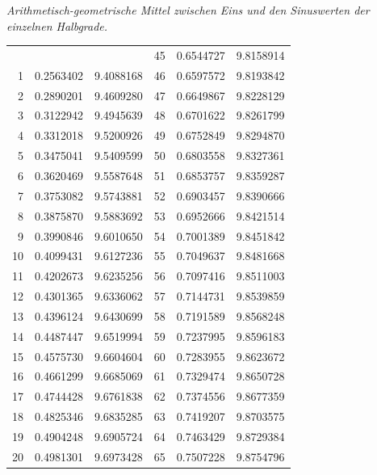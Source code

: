 \begingroup
\renewcommand{\arraystretch}{1.45}
\clearpage
{}
\begin{center}
\textit{Arithmetisch-geometrische Mittel zwischen Eins und den Sinuswerten der einzelnen Halbgrade.}\par
\medskip
\begingroup\fontsize{9}{10.2}\selectfont\setlength{\tabcolsep}{4pt}\renewcommand{\arraystretch}{1.0}
\begin{tabular}{||r|r|r||r|r|r||}\hline\hline
 &  &  & 45 & 0.6544727 & 9.8158914 \\
1 & 0.2563402 & 9.4088168 & 46 & 0.6597572 & 9.8193842 \\
2 & 0.2890201 & 9.4609280 & 47 & 0.6649867 & 9.8228129 \\
3 & 0.3122942 & 9.4945639 & 48 & 0.6701622 & 9.8261799 \\
4 & 0.3312018 & 9.5200926 & 49 & 0.6752849 & 9.8294870 \\
5 & 0.3475041 & 9.5409599 & 50 & 0.6803558 & 9.8327361 \\[3pt]
6 & 0.3620469 & 9.5587648 & 51 & 0.6853757 & 9.8359287 \\
7 & 0.3753082 & 9.5743881 & 52 & 0.6903457 & 9.8390666 \\
8 & 0.3875870 & 9.5883692 & 53 & 0.6952666 & 9.8421514 \\
9 & 0.3990846 & 9.6010650 & 54 & 0.7001389 & 9.8451842 \\
10 & 0.4099431 & 9.6127236 & 55 & 0.7049637 & 9.8481668 \\[3pt]
11 & 0.4202673 & 9.6235256 & 56 & 0.7097416 & 9.8511003 \\
12 & 0.4301365 & 9.6336062 & 57 & 0.7144731 & 9.8539859 \\
13 & 0.4396124 & 9.6430699 & 58 & 0.7191589 & 9.8568248 \\
14 & 0.4487447 & 9.6519994 & 59 & 0.7237995 & 9.8596183 \\
15 & 0.4575730 & 9.6604604 & 60 & 0.7283955 & 9.8623672 \\[3pt]
16 & 0.4661299 & 9.6685069 & 61 & 0.7329474 & 9.8650728 \\
17 & 0.4744428 & 9.6761838 & 62 & 0.7374556 & 9.8677359 \\
18 & 0.4825346 & 9.6835285 & 63 & 0.7419207 & 9.8703575 \\
19 & 0.4904248 & 9.6905724 & 64 & 0.7463429 & 9.8729384 \\
20 & 0.4981301 & 9.6973428 & 65 & 0.7507228 & 9.8754796 \\[3pt]

\end{tabular}
\end{center}

